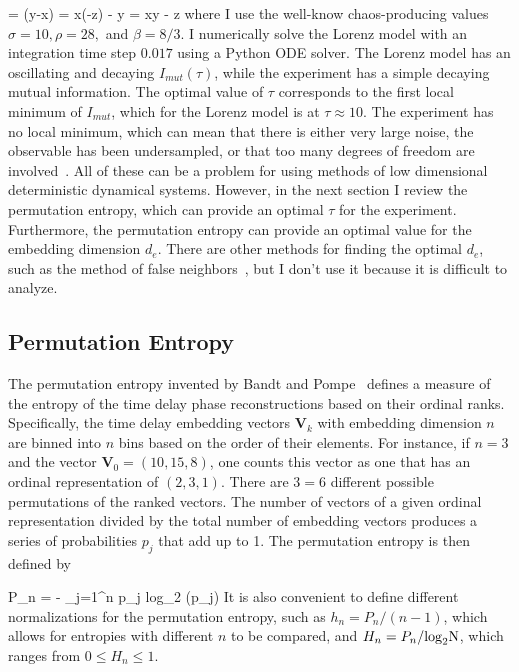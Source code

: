 \beq
\label{lorenz_model}
 = \sigma(y-x)   \qquad {} =  x(\rho-z) - y  \qquad {} = xy - \beta z
\eeq
where I use the well-know chaos-producing values $\sigma=10, \rho=28,$ and $\beta = 8/3$. I numerically solve the Lorenz model with an integration time step $0.017$ using a Python ODE solver.
The Lorenz model has an oscillating and decaying $I_{mut}(\tau)$, while the experiment has a simple decaying mutual information. The optimal value of $\tau$ corresponds to the first local minimum
of $I_{mut}$, which for the Lorenz model is at $\tau \approx 10$. The experiment has no local minimum, which can mean that there is either very large noise, the observable has been undersampled,
or that too many degrees of freedom are involved~\cite{manneville2004}. All of these can be a problem for using methods of low dimensional deterministic dynamical systems. However, in the next
section I review the permutation entropy, which can provide an optimal $\tau$ for the experiment. Furthermore, the permutation entropy can provide an optimal value for the embedding dimension
$d_e$. There are other methods for finding the optimal $d_e$, such as the method of false neighbors~\cite{manneville2004}, but I don't use it because it is difficult to analyze.

\subsection{Permutation Entropy}
\label{ss_pe}

The permutation entropy invented by Bandt and Pompe~\cite{bandt2002} defines a measure of the entropy of the time delay phase reconstructions based on their ordinal ranks. Specifically,
the time delay embedding vectors ${\mathbf{V}}_k$ with embedding dimension $n$ are binned into $n\!$ bins based on the order of their elements. For instance, if $n=3$ and the vector
${\mathbf{V}}_0 = (10,15,8)$, one counts this vector as one that has an ordinal representation of $(2,3,1)$. There are $3\!=6$ different possible permutations of the ranked vectors. 
The number of vectors of a given ordinal representation divided by the total number of embedding vectors produces a series of probabilities $p_j$ that add up to 1. The permutation entropy
is then defined by

\beq
\label{perm_ent}
P_n = - \sum_{j=1}^{n\!} p_j \rm{log}_2 (p_j)
\eeq
It is also convenient to define different normalizations for the permutation entropy, such as $h_n = P_n/(n-1)$, which allows for entropies with different $n$ to be compared, and
$H_n = P_n/\rm{log}_2 N$, which ranges from $0 \le H_n \le 1$.
